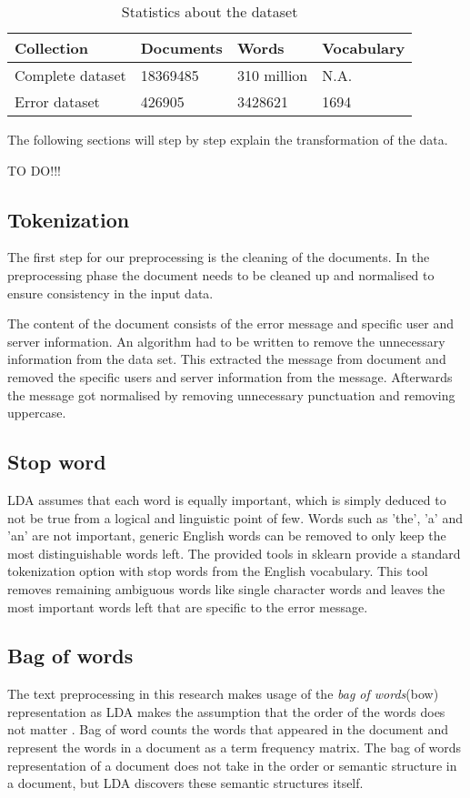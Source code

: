 \begin{table}[h]
\centering
 \begin{tabular}{|l|l|l|l|} 
 \hline
 Collection & Documents & Words & Vocabulary  \\ [0.5ex] 
 \hline\hline
 Complete dataset & 18369485 & 310 million & N.A.  \\ 
 Error dataset & 426905 & 3428621 & 1694 \\
 \hline
 \end{tabular}
\caption{Statistics about the dataset}
\label{tab:table2}
\end{table}

The following sections will step by step explain the transformation of the data.

TO DO!!!

\subsection{Tokenization}\label{methodology:tokenization}
The first step for our preprocessing is the cleaning of the documents. 
In the preprocessing phase the document needs to be cleaned up and normalised to ensure consistency in the input data.

The content of the document consists of the error message and specific user and server information. An algorithm had to be written to remove the unnecessary information from the data set. This extracted the message from document and removed the specific users and server information from the message. Afterwards the message got normalised by removing unnecessary punctuation and removing uppercase.

\subsection{Stop word}\label{methodology:stop_words}
LDA assumes that each word is equally important, which is simply deduced to not be true from a logical and linguistic point of few. Words such as 'the', 'a' and 'an' are not important, generic English words can be removed to only keep the most distinguishable words left. The provided tools in sklearn provide a standard tokenization option with stop words from the English vocabulary. This tool removes remaining ambiguous words like single character words and leaves the most important words left that are specific to the error message.

\subsection{Bag of words} \label{methodology:bagow}
The text preprocessing in this research makes usage of the \textit{bag of words}(bow) representation as LDA makes the assumption that the order of the words does not matter \cite{Blei2010}. Bag of word counts the words that appeared in the document and represent the words in a document as a term frequency matrix. The bag of words representation of a document does not take in the order or semantic structure in a document, but LDA discovers these semantic structures itself. 

